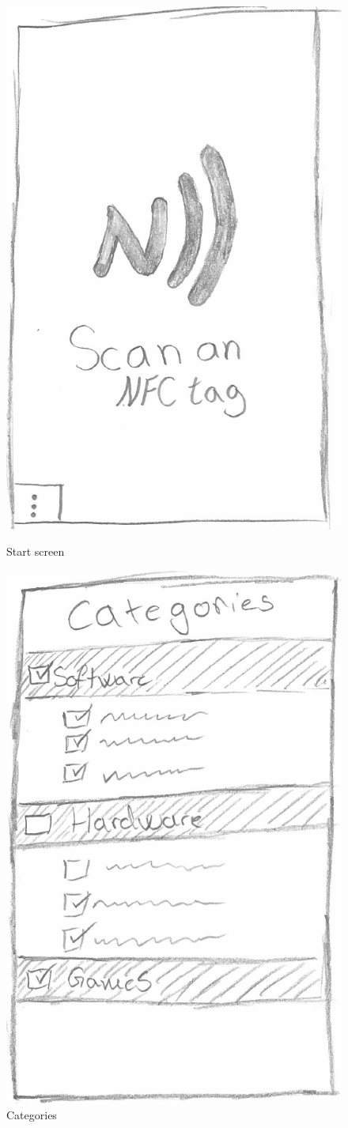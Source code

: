 \begin{figure}[H]
\begin{minipage}[b]{0.5\columnwidth}
\centering
\includegraphics[width=0.7\columnwidth]{img/prototype/1.png}
\caption{Start screen\label{fig:start}}
\end{minipage}
\hspace{0.5cm}
\begin{minipage}[b]{0.5\columnwidth}
\centering
\includegraphics[width=0.7\columnwidth]{img/prototype/2.png}
\caption{Categories\label{fig:categories}}
\end{minipage}
\end{figure}


